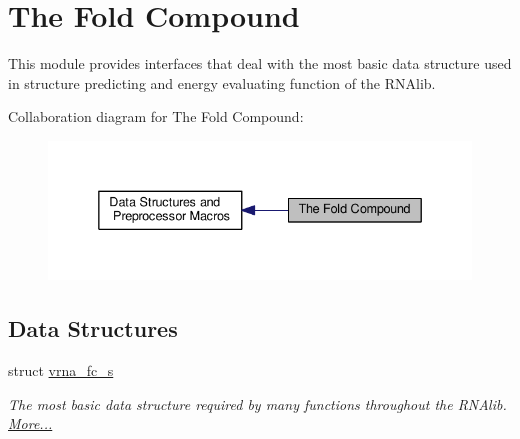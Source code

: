 \hypertarget{group__fold__compound}{\section{The Fold Compound}
\label{group__fold__compound}
}


This module provides interfaces that deal with the most basic data structure used in structure predicting and energy evaluating function of the R\-N\-Alib.  


Collaboration diagram for The Fold Compound\-:
\nopagebreak
\begin{figure}[H]
\begin{center}
\leavevmode
\includegraphics[width=336pt]{group__fold__compound}
\end{center}
\end{figure}
\subsection*{Data Structures}
\begin{DoxyCompactItemize}
\item 
struct \hyperlink{group__fold__compound_structvrna__fc__s}{vrna\-\_\-fc\-\_\-s}
\begin{DoxyCompactList}\small\item\em The most basic data structure required by many functions throughout the R\-N\-Alib.  \hyperlink{group__fold__compound_structvrna__fc__s}{More...}\end{DoxyCompactList}\end{DoxyCompactItemize}
